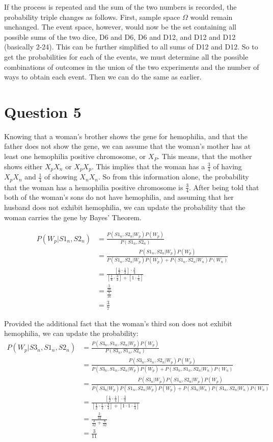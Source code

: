 \documentclass{article}[12 pt]
\begin{document}
\noindent
If the process is repeated and the sum of the two numbers is recorded, the probability triple changes as follows.  First, sample space $\Omega$ would remain unchanged.  The event space, however, would now be the set containing all possible sums of the two dice, D6 and D6, D6 and D12, and D12 and D12 (basically 2-24).  This can be further simplified to all sums of D12 and D12.  So to get the probabilities for each of the events, we must determine all the possible combinations of outcomes in the union of the two experiments and the number of ways to obtain each event.  Then we can do the same as earlier.


\section*{Question 5}
Knowing that a woman's brother shows the gene for hemophilia, and that the father does not show the gene, we can assume that the woman's mother has at least one hemophilia positive chromosome, or $X_P$.  This means, that the mother shows either $X_{p}X_{n}$ or $X_{p}X_{p}$.  This implies that the woman has a $\frac{3}{4}$ of having $X_{p}X_{n}$ and $\frac{1}{4}$ of showing $X_{n}X_{n}$.  So from this information alone, the probability that the woman has a hemophilia positive chromosome is $\boxed{\frac{3}{4}}$.  After being told that both of the woman's sons do not have hemophilia, and assuming that her husband does not exhibit hemophilia, we can update the probability that the woman carries the gene by Bayes' Theorem.

\begin{align*}
	P(W_{p}|S1_{n},S2_{n}) &= \frac{P(S1_{n},S2_{n}|W_{p})P(W_{p})}{P(S1_{n},S2_{n})} \\
	&=  \frac{P(S1_{n},S2_{n}|W_{p})P(W_{p})}{P(S1_{n},S2_{n}|W_{p})P(W_{p})+ P(S1_{n},S2_{n}|W_{n})P(W_{n})} \\
	&= \frac{[\frac{1}{2}\cdot\frac{1}{2}]\cdot \frac{3}{4}}{[\frac{1}{4}\cdot \frac{3}{4}] +[1 \cdot \frac{1}{4}]} \\
	&=\frac{\frac{3}{16}}{\frac{7}{16}}\\
	&= \boxed{\frac{3}{7}}
\end{align*} 

\noindent
Provided the additional fact that the woman's third son does not exhibit hemophilia, we can update the probability:
\begin{align*}
P(W_{p}|S3_{n},S1_{n},S2_{n}) &= \frac{P(S3_{n},S1_{n},S2_{n}|W_{p})P(W_{p})}{P(S3_{n},S1_{n},S2_{n})} \\
&= \frac{P(S3_{n},S1_{n},S2_{n}|W_{p})P(W_{p})}{P(S3_{n},S1_{n},S2_{n}|W_{p})P(W_{p})+ P(S3_{n},S1_{n},S2_{n}|W_{n})P(W_{n})} \\
&=\frac{P(S3_{n}|W_{p})P(S1_{n},S2_{n}|W_{p})P(W_{p})}{P(S3_{n}|W_{p})P(S1_{n},S2_{n}|W_{p})P(W_{p})+ P(S3_{n}|W_{n})P(S1_{n},S2_{n}|W_{n})P(W_{n})} \\
&= \frac{[\frac{1}{2}\cdot\frac{1}{4}]\cdot \frac{3}{4}}{[\frac{1}{2} \cdot\frac{1}{4}\cdot \frac{3}{4}] +[1 \cdot 1 \cdot \frac{1}{4}]} \\
&=\frac{\frac{3}{32}}{\frac{3}{32} + \frac{8}{32}}\\
&= \boxed{\frac{3}{11}}
\end{align*} 
\end{document}
